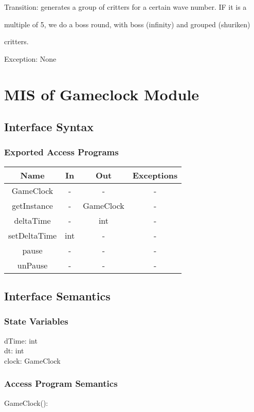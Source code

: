 \documentclass[12,english]{article}
\begin{document}
		Transition: generates a group of critters for a certain wave number. IF it is a 
		
		multiple of 5, we do a boss round, with boss (infinity) and grouped (shuriken) 
		
		critters.
		
		Exception: None
		\\

\section{MIS of Gameclock Module}
	\subsection{Interface Syntax}
		\subsubsection{Exported Access Programs}
		
	\begin{tabular}[pos]{|c|c|c|c|}
	\hline
	\textbf{Name}& \textbf{In} & \textbf{Out} & \textbf{Exceptions} \\ 
	\hline
	GameClock & - & - & -\\ \hline
	getInstance & - & GameClock & -\\ \hline
	deltaTime & - & int & -\\ \hline
	setDeltaTime & int & - & -\\ \hline
	pause & - & - & -\\ \hline
	unPause & - & - & -\\ \hline
					
	\end{tabular}		
		
	\subsection{Interface Semantics}
		\subsubsection{State Variables}
		dTime: int\\
		dt: int\\
		clock: GameClock\\
		

		\subsubsection{Access Program Semantics}
	GameClock():
		
\end{document}
